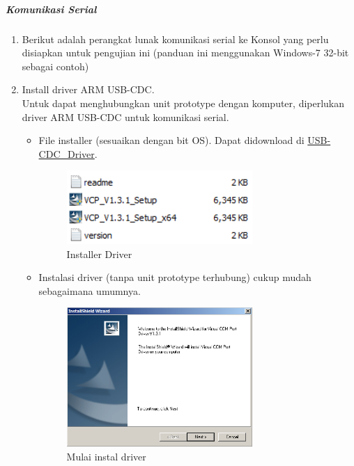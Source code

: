 \documentclass{article}
\begin{document}
	\subparagraph{Komunikasi Serial}

	\begin{enumerate}
		\item Berikut adalah perangkat lunak komunikasi serial ke Konsol yang perlu disiapkan untuk pengujian ini (panduan ini menggunakan Windows-7 32-bit sebagai contoh)

		\item Install driver ARM USB-CDC.\\
		Untuk dapat menghubungkan unit prototype dengan komputer,
		diperlukan driver ARM USB-CDC untuk komunikasi serial.

		\begin{itemize}
			\item File installer (sesuaikan dengan bit OS).
			Dapat didownload di \href{https://drive.google.com/drive/folders/19gXVrxR68SFHQUGGGgKb0Da03oV7Rh41?usp=share_link}{USB-CDC\_Driver}.
			\begin{figure}[H]
				\centering
				\includegraphics[width=200pt]{images/software/driver}
				\caption{Installer Driver}
			\end{figure}

			\item Instalasi driver (tanpa unit prototype terhubung) cukup mudah sebagaimana umumnya.
			\begin{figure}[H]
				\centering
				\includegraphics[width=200pt]{images/software/install_driver}
				\caption{Mulai instal driver}
			\end{figure}
		\end{itemize}


\end{enumerate}
\end{document}
